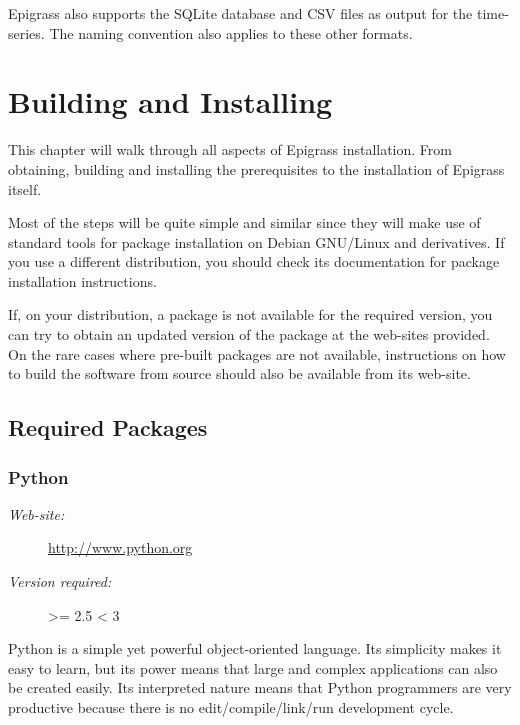 \documentclass[a4paper,10pt,english]{sphinxmanual}
\begin{document}
Epigrass also supports the SQLite database and CSV files as output for the time-series. The naming convention also applies to these other formats.


\chapter{Building and Installing}
\label{install:install}\label{install::doc}\label{install:building-and-installing}
This chapter will walk through all aspects of Epigrass installation. From obtaining, building and installing  the prerequisites to the installation of Epigrass itself.

Most of the steps will be quite simple and similar since they will make use of standard tools for package installation on Debian GNU/Linux and derivatives. If you use a different distribution, you should check its documentation for package installation instructions.

If, on your distribution, a package is not available for the required version, you can try to obtain an updated version of the package at the web-sites provided. On the rare cases where pre-built packages are not available, instructions on how to build the software from source should also be available from its web-site.


\section{Required Packages}
\label{install:required-packages}

\subsection{Python}
\label{install:python}\begin{description}
\item[{\emph{Web-site:}}] \leavevmode
\href{http://www.python.org}{http://www.python.org}

\item[{\emph{Version required:}}] \leavevmode
\textgreater{}= 2.5 \textless{} 3

\end{description}

Python is a simple yet powerful object-oriented language. Its simplicity makes it easy to learn, but its power means that large and complex applications can also be created easily. Its interpreted nature means that Python programmers are very productive because there is no edit/compile/link/run development cycle.
\end{document}
